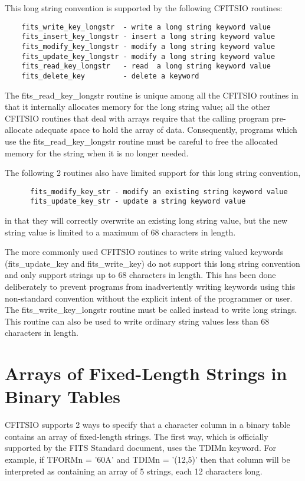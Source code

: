 \documentclass[11pt]{book}
\begin{document}
This long string convention is supported by the following CFITSIO
routines:

\begin{verbatim}
    fits_write_key_longstr  - write a long string keyword value
    fits_insert_key_longstr - insert a long string keyword value
    fits_modify_key_longstr - modify a long string keyword value
    fits_update_key_longstr - modify a long string keyword value
    fits_read_key_longstr   - read  a long string keyword value
    fits_delete_key         - delete a keyword
\end{verbatim}
The fits\_read\_key\_longstr routine is unique among all the CFITSIO
routines in that it internally allocates memory for the long string
value;  all the other CFITSIO routines that deal with arrays require
that the calling program pre-allocate adequate space to hold the array
of data.  Consequently, programs which use the fits\_read\_key\_longstr
routine must be careful to free the allocated memory for the string
when it is no longer needed.

The following 2 routines also have limited support for this long string
convention,

\begin{verbatim}
      fits_modify_key_str - modify an existing string keyword value
      fits_update_key_str - update a string keyword value
\end{verbatim}
in that they will correctly overwrite an existing long string value,
but the new string value is limited to a maximum of 68 characters in
length.

The more commonly used CFITSIO routines to write string valued keywords
(fits\_update\_key and fits\_write\_key) do not support this long
string convention and only support strings up to 68 characters in
length.  This has been done deliberately to prevent programs from
inadvertently writing keywords using this non-standard convention
without the explicit intent of the programmer or user.   The
fits\_write\_key\_longstr routine must be called instead to write long
strings.  This routine can also be used to write ordinary string values
less than 68 characters in length.


\section{Arrays of Fixed-Length Strings in Binary Tables}

CFITSIO supports 2 ways to specify that a character column in a binary
table contains an array of fixed-length strings.  The first way, which
is officially supported by the FITS Standard document, uses the TDIMn keyword.
For example, if TFORMn = '60A' and TDIMn = '(12,5)' then that
column will be interpreted as containing an array of 5 strings, each 12
characters long.
\end{document}
